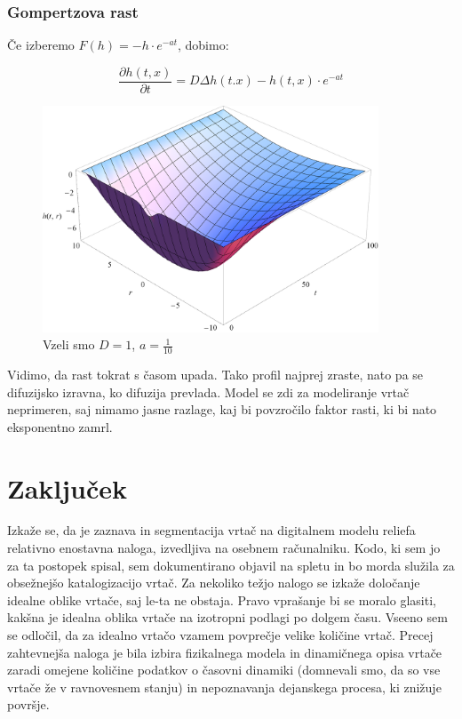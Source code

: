 \documentclass[a4paper, oneside, 12pt]{book}
\begin{document}
          \subsection{Gompertzova rast}

          Če izberemo $F(h) = - h \cdot e^{-a t}$, dobimo:

            \begin{equation}
              \frac{ \partial h(t,x) }{ \partial t} = D \Delta h(t.x) - h(t,x) \cdot e^{-a t}
              \label{difuzija-gompertzova-rast}
            \end{equation}

            \begin{figure}[H]
              \begin{center}
                \includegraphics[width=10cm]{slike/difuzija-gompertzova-rast2}
              \end{center}
              \caption{Vzeli smo $D=1$, $a=\frac{1}{10}$}
              \label{fig:difuzija-gompertzova-rast}
            \end{figure}

            Vidimo, da rast tokrat s časom upada. Tako profil najprej zraste, nato pa se difuzijsko izravna, ko difuzija prevlada.
            Model se zdi za modeliranje vrtač neprimeren, saj nimamo jasne razlage, kaj bi povzročilo faktor rasti, ki bi nato eksponentno zamrl.


            \chapter{Zaključek}

            Izkaže se, da je zaznava in segmentacija vrtač na digitalnem modelu reliefa relativno enostavna naloga, izvedljiva na osebnem računalniku. Kodo, ki sem jo za ta postopek spisal, sem dokumentirano objavil na spletu in bo morda služila za obsežnejšo katalogizacijo vrtač.
Za nekoliko težjo nalogo se izkaže določanje idealne oblike vrtače, saj le-ta ne obstaja. Pravo vprašanje bi se moralo glasiti, kakšna je idealna oblika vrtače na izotropni podlagi po dolgem času. Vseeno sem se odločil, da za idealno vrtačo vzamem povprečje velike količine vrtač.
Precej zahtevnejša naloga je bila izbira fizikalnega modela in dinamičnega opisa vrtače zaradi omejene količine podatkov o časovni dinamiki (domnevali smo, da so vse vrtače že v ravnovesnem stanju) in nepoznavanja dejanskega procesa, ki znižuje površje.
\end{document}
